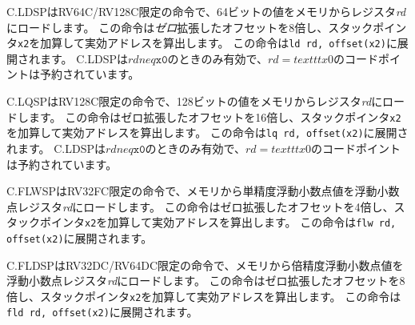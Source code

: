 \begin{comment}
C.LDSP is an RV64C/RV128C-only instruction that loads a 64-bit value from memory into
register {\em rd}.  It computes its effective address by adding the
zero-extended offset, scaled by 8, to the stack pointer, {\tt x2}.
It expands to {\tt ld rd, offset(x2)}.
C.LDSP is only valid when $\textit{rd}{\neq}\texttt{x0}$;
the code points with $\textit{rd}{=}\texttt{x0}$ are reserved.
\end{comment}
C.LDSPはRV64C/RV128C限定の命令で、64ビットの値をメモリからレジスタ{\em rd}にロードします。
この命令は{\em ゼロ}拡張したオフセットを8倍し、スタックポインタ{\tt x2}を加算して実効アドレスを算出します。
この命令は{\tt ld rd, offset(x2)}に展開されます。
C.LDSPは$\textit{rd}{neq}\texttt{x0}$のときのみ有効で、$\textit{rd}{=}texttt{x0}$のコードポイントは予約されています。

\begin{comment}
C.LQSP is an RV128C-only instruction that loads a 128-bit value from memory
into register {\em rd}.  It computes its effective address by adding the
zero-extended offset, scaled by 16, to the stack pointer, {\tt x2}.
It expands to {\tt lq rd, offset(x2)}.
C.LQSP is only valid when $\textit{rd}{\neq}\texttt{x0}$;
the code points with $\textit{rd}{=}\texttt{x0}$ are reserved.
\end{comment}
C.LQSPはRV128C限定の命令で、128ビットの値をメモリからレジスタ{\em rd}にロードします。
この命令はゼロ拡張したオフセットを16倍し、スタックポインタ{\tt x2}を加算して実効アドレスを算出します。
この命令は{\tt lq rd, offset(x2)}に展開されます。
C.LDSPは$\textit{rd}{neq}\texttt{x0}$のときのみ有効で、$\textit{rd}{=}texttt{x0}$のコードポイントは予約されています。

\begin{comment}
C.FLWSP is an RV32FC-only instruction that loads a single-precision
floating-point value from memory into floating-point register {\em rd}. It
computes its effective address by adding the {\em zero}-extended offset,
scaled by 4, to the stack pointer, {\tt x2}.  It expands to {\tt flw rd,
offset(x2)}.
\end{comment}
C.FLWSPはRV32FC限定の命令で、メモリから単精度浮動小数点値を浮動小数点レジスタ{\em rd}にロードします。
この命令はゼロ拡張したオフセットを4倍し、スタックポインタ{\tt x2}を加算して実効アドレスを算出します。
この命令は{\tt flw rd, offset(x2)}に展開されます。

\begin{comment}
C.FLDSP is an RV32DC/RV64DC-only instruction that loads a double-precision
floating-point value from memory into floating-point register {\em rd}. It
computes its effective address by adding the {\em zero}-extended offset,
scaled by 8, to the stack pointer, {\tt x2}.  It expands to {\tt fld rd,
offset(x2)}.
\end{comment}
C.FLDSPはRV32DC/RV64DC限定の命令で、メモリから倍精度浮動小数点値を浮動小数点レジスタ{\em rd}にロードします。
この命令はゼロ拡張したオフセットを8倍し、スタックポインタ{\tt x2}を加算して実効アドレスを算出します。
この命令は{\tt fld rd, offset(x2)}に展開されます。

